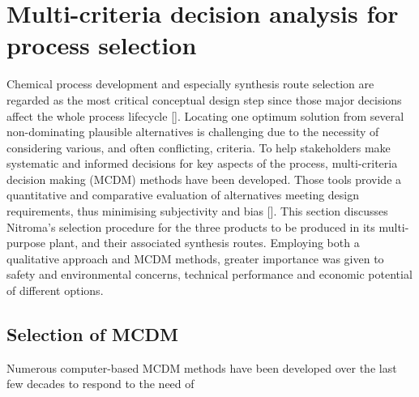 \section{Multi-criteria decision analysis for process selection}

Chemical process development and especially synthesis route selection are regarded as the most critical conceptual design step since those major decisions affect the whole process lifecycle []. Locating one optimum solution from several non-dominating plausible alternatives is challenging due to the necessity of considering various, and often conflicting, criteria. To help stakeholders make systematic and informed decisions for key aspects of the process, multi-criteria decision making (MCDM) methods have been developed. Those tools provide a quantitative and comparative evaluation of alternatives meeting design requirements, thus minimising subjectivity and bias []. 
This section discusses Nitroma's selection procedure for the three products to be produced in its multi-purpose plant, and their associated synthesis routes. Employing both a qualitative approach and MCDM methods, greater importance was given to safety and environmental concerns, technical performance and economic potential of different options.




\subsection{Selection of MCDM} %

Numerous computer-based MCDM methods have been developed over the last few decades to respond to the need of 




